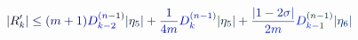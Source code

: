 \documentclass[12pt]{article}
\begin{document}
\makeatletter
\renewcommand*{\@textcolor}[3]{%
  \protect\leavevmode
  \begingroup
    \color#1{#2}#3%
  \endgroup
}
\makeatother
\begin{displaymath}
\mathcolor[RGB]{0,0,15}{|} \mathcolor[RGB]{0,0,30}{R} _ { \mathcolor[RGB]{0,0,45}{k} } ^ { \mathcolor[RGB]{0,0,60}{\prime} } \mathcolor[RGB]{0,0,75}{|} \mathcolor[RGB]{0,0,90}{\le} \mathcolor[RGB]{0,0,105}{(} \mathcolor[RGB]{0,0,120}{m} \mathcolor[RGB]{0,0,135}{+} \mathcolor[RGB]{0,0,150}{1} \mathcolor[RGB]{0,0,165}{)} \mathcolor[RGB]{0,0,180}{D} _ { \mathcolor[RGB]{0,0,195}{k} \mathcolor[RGB]{0,0,210}{-} \mathcolor[RGB]{0,0,225}{2} } ^ { \mathcolor[RGB]{0,0,240}{(} \mathcolor[RGB]{0,0,255}{n} \mathcolor[RGB]{0,15,0}{-} \mathcolor[RGB]{0,15,15}{1} \mathcolor[RGB]{0,15,30}{)} } \mathcolor[RGB]{0,15,45}{|} \mathcolor[RGB]{0,15,60}{\eta} _ { \mathcolor[RGB]{0,15,75}{5} } \mathcolor[RGB]{0,15,90}{|} \mathcolor[RGB]{0,15,105}{+} \mathcolor[RGB]{0,15,120}{\frac { \mathcolor[RGB]{0,15,135}{1} } { \mathcolor[RGB]{0,15,150}{4} \mathcolor[RGB]{0,15,165}{m} } } \mathcolor[RGB]{0,15,180}{D} _ { \mathcolor[RGB]{0,15,195}{k} } ^ { \mathcolor[RGB]{0,15,210}{(} \mathcolor[RGB]{0,15,225}{n} \mathcolor[RGB]{0,15,240}{-} \mathcolor[RGB]{0,15,255}{1} \mathcolor[RGB]{0,30,0}{)} } \mathcolor[RGB]{0,30,15}{|} \mathcolor[RGB]{0,30,30}{\eta} _ { \mathcolor[RGB]{0,30,45}{5} } \mathcolor[RGB]{0,30,60}{|} \mathcolor[RGB]{0,30,75}{+} \mathcolor[RGB]{0,30,90}{\frac { \mathcolor[RGB]{0,30,105}{|} \mathcolor[RGB]{0,30,120}{1} \mathcolor[RGB]{0,30,135}{-} \mathcolor[RGB]{0,30,150}{2} \mathcolor[RGB]{0,30,165}{\sigma} \mathcolor[RGB]{0,30,180}{|} } { \mathcolor[RGB]{0,30,195}{2} \mathcolor[RGB]{0,30,210}{m} } } \mathcolor[RGB]{0,30,225}{D} _ { \mathcolor[RGB]{0,30,240}{k} \mathcolor[RGB]{0,30,255}{-} \mathcolor[RGB]{0,45,0}{1} } ^ { \mathcolor[RGB]{0,45,15}{(} \mathcolor[RGB]{0,45,30}{n} \mathcolor[RGB]{0,45,45}{-} \mathcolor[RGB]{0,45,60}{1} \mathcolor[RGB]{0,45,75}{)} } \mathcolor[RGB]{0,45,90}{|} \mathcolor[RGB]{0,45,105}{\eta} _ { \mathcolor[RGB]{0,45,120}{6} } \mathcolor[RGB]{0,45,135}{|}
\end{displaymath}
\end{document}
